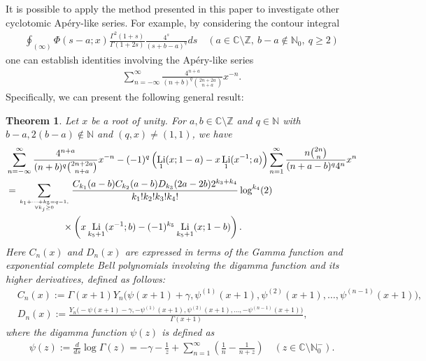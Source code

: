 \documentclass[11pt]{article}
\DeclareMathOperator{\Li}{Li}
\def\N{\mathbb{N}}
\def\Z{\mathbb{Z}}
\theoremstyle{plain}
\newtheorem{thm}{Theorem}[section]
\theoremstyle{definition}
\begin{document}
It is possible to apply the method presented in this paper to investigate other cyclotomic Ap\'ery-like series. For example, by considering the contour integral
\begin{align}\label{contour-integ-general}
\oint_{(\infty)} \Phi(s-a;x) \frac{\Gamma^2(1+s)}{\Gamma(1+2s)}\frac{4^s}{(s+b-a)^q}ds\quad (a\in\mathbb{C}\setminus\Z,\ b-a\notin\N_0,\ q\geq 2)
\end{align}
one can establish identities involving the Ap\'ery-like series
\begin{align*}
\sum_{n=-\infty}^\infty \frac{4^{n+a}}{(n+b)^q\binom{2n+2a}{n+a}}x^{-n}.
\end{align*}
Specifically, we can present the following general result:
\begin{thm}\label{thm-general-CAS} Let $x$ be a root of unity. For $a,b\in \mathbb{C}\setminus \Z$ and $q\in \N$ with $b-a,2(b-a)\notin \N$ and $(q,x)\neq (1,1)$, we have
\begin{align}\label{equ-general-thm-CPAS}
&\sum_{n=-\infty}^\infty \frac{4^{n+a}}{(n+b)^q\binom{2n+2a}{n+a}}x^{-n}-(-1)^q\left(\Li_1(x;1-a)-x\Li_1(x^{-1};a)\right) \sum_{n=1}^\infty \frac{n\binom{2n}{n}}{(n+a-b)^{q}4^n}x^n\nonumber\\
&=\sum_{k_1+\cdots+k_5=q-1,\atop \forall k_j\geq 0} \frac{C_{k_1}(a-b)C_{k_2}(a-b)D_{k_3}(2a-2b)2^{k_3+k_4}}{k_1!k_2!k_3!k_4!}\log^{k_4}(2)\nonumber\\&\qquad\qquad\qquad\times\left(x\Li_{k_5+1}(x^{-1};b)-(-1)^{k_5}\Li_{k_5+1}(x;1-b)\right).
\end{align}
Here $C_n(x)$ and $D_n(x)$ are expressed in terms of the Gamma function and exponential complete Bell polynomials involving the digamma function and its higher derivatives, defined as follows:
\begin{align}
&C_n(x):=\Gamma(x+1)Y_n\Big(\psi(x+1)+\gamma,\psi^{(1)}(x+1),\psi^{(2)}(x+1),\ldots,\psi^{(n-1)}(x+1)\Big),\label{defn-general-C-squ}\\
&D_n(x):=\frac{Y_n\Big(-\psi(x+1)-\gamma,-\psi^{(1)}(x+1),\psi^{(2)}(x+1),\ldots,-\psi^{(n-1)}(x+1)\Big)}{\Gamma(x+1)},\label{defn-general-D-squ}
\end{align}
where the \emph{digamma function} $\psi(z)$ is defined as
\begin{align}
\psi(z):=\frac{d}{ds}\log\Gamma(z)=-\gamma-\frac1{z}+\sum_{n=1}^\infty \left(\frac1{n}-\frac1{n+z}\right)\quad (z\in \mathbb{C}\setminus \N_0^-).
\end{align}
\end{thm}
\end{document}
